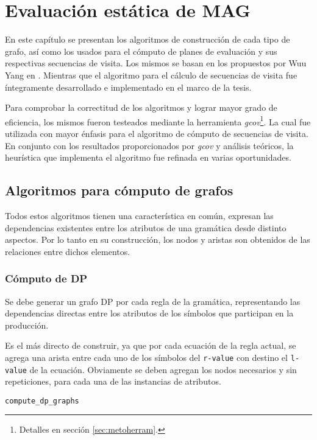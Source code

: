 \chapter{Evaluación estática de MAG}
\label{chap:eval_est}
\minitoc

En este capítulo se presentan los algoritmos de construcción de cada tipo de grafo, así como los usados para el cómputo de planes de evaluación y sus respectivas secuencias de visita. Los mismos se basan en los propuestos por Wuu Yang en \cite{wuu-yang1}. Mientras que el algoritmo para el cálculo de secuencias de visita fue íntegramente desarrollado e implementado en el marco de la tesis.

Para comprobar la correctitud de los algoritmos y lograr mayor grado de eficiencia, los mismos fueron testeados mediante la herramienta \textit{gcov}\footnote{Detalles en sección \ref{sec:metoherram}.}. La cual fue utilizada con mayor énfasis para el algoritmo de cómputo de secuencias de visita. En conjunto con los resultados proporcionados por \textit{gcov} y análisis teóricos, la heurística que implementa el algoritmo fue refinada en varias oportunidades.

\section{Algoritmos para cómputo de grafos}

Todos estos algoritmos tienen una característica en común, expresan las dependencias existentes entre los atributos de una gramática desde distinto aspectos. Por lo tanto en su construcción, los nodos y aristas son obtenidos de las relaciones entre dichos elementos.

\subsection{Cómputo de DP}

Se debe generar un grafo DP por cada regla de la gramática, representando las dependencias directas entre los atributos de los símbolos que participan en la producción.

Es el más directo de construir, ya que por cada ecuación de la regla actual, se agrega una arista entre cada uno de los símbolos del \texttt{r-value} con destino el \texttt{l-value} de la ecuación. Obviamente se deben agregan los nodos necesarios y sin repeticiones, para cada una de las instancias de atributos.

\begin{algorithm}[H]

\caption{\texttt{compute\_dp\_graphs}}
\end{algorithm}

